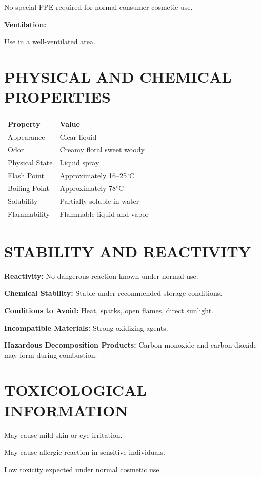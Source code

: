 \documentclass[11pt]{article}
\begin{document}
No special PPE required for normal consumer cosmetic use.

\textbf{Ventilation:}

Use in a well-ventilated area.

\section{PHYSICAL AND CHEMICAL PROPERTIES}

\begin{longtable}{|p{2.5in}|p{3in}|}
\hline
\textbf{Property} & \textbf{Value} \\
\hline
Appearance & Clear liquid \\
\hline
Odor & Creamy floral sweet woody \\
\hline
Physical State & Liquid spray \\
\hline
Flash Point & Approximately 16--25$^\circ$C \\
\hline
Boiling Point & Approximately 78$^\circ$C \\
\hline
Solubility & Partially soluble in water \\
\hline
Flammability & Flammable liquid and vapor \\
\hline
\end{longtable}

\section{STABILITY AND REACTIVITY}

\textbf{Reactivity:} No dangerous reaction known under normal use.

\textbf{Chemical Stability:} Stable under recommended storage conditions.

\textbf{Conditions to Avoid:} Heat, sparks, open flames, direct sunlight.

\textbf{Incompatible Materials:} Strong oxidizing agents.

\textbf{Hazardous Decomposition Products:} Carbon monoxide and carbon dioxide may form during combustion.

\section{TOXICOLOGICAL INFORMATION}

May cause mild skin or eye irritation.

May cause allergic reaction in sensitive individuals.

Low toxicity expected under normal cosmetic use.
\end{document}
